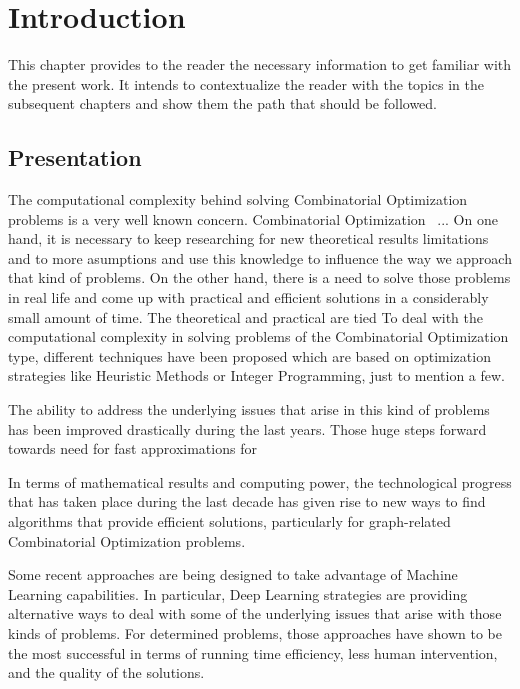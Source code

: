 %
%
\let\textcircled=\pgftextcircled
\chapter{Introduction}
\label{Chapter1}

This chapter provides to the reader the necessary information to get familiar with the present work. It intends to contextualize the reader with the topics in the subsequent chapters and show them the path that should be followed.

\section{Presentation}


The computational complexity behind solving Combinatorial Optimization problems is a very well known concern. 
Combinatorial Optimization ~\cite{appcombinatorial}... On one hand, it is necessary to keep researching for new theoretical results limitations and to more asumptions and use this knowledge to influence the way we approach that kind of problems. On the other hand, there is a need to solve those problems in real life and come up with practical and efficient solutions in a considerably small amount of time. The theoretical and practical are tied
To deal with the computational complexity in solving problems of the Combinatorial Optimization type, different techniques have been proposed which are based on optimization strategies like Heuristic Methods or Integer Programming, just to mention a few.

The ability to address the underlying issues that arise in this kind of problems has been improved drastically during the last years. Those huge steps forward towards need for fast approximations for 

In terms of mathematical results and computing power, the technological progress that has taken place during the last decade has given rise to new ways to find algorithms that provide efficient solutions, particularly for graph-related Combinatorial Optimization problems.

Some recent approaches are being designed to take advantage of Machine Learning capabilities. In particular, Deep Learning strategies are providing alternative ways to deal with some of the underlying issues that arise with those kinds of problems. For determined problems, those approaches have shown to be the most successful in terms of running time efficiency, less human intervention, and the quality of the solutions. \\


